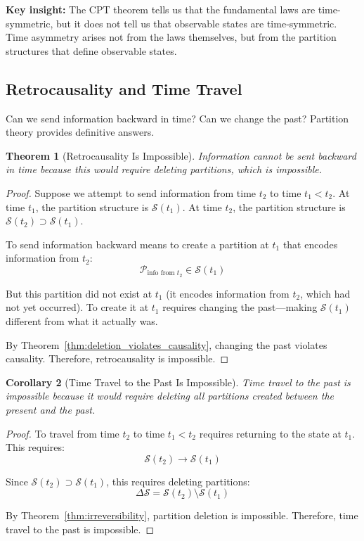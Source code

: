 \documentclass[twocolumn,10pt]{article}
\newtheorem{theorem}{Theorem}[section]
\newtheorem{corollary}[theorem]{Corollary}
\theoremstyle{definition}
\theoremstyle{remark}
\begin{document}
\noindent\textbf{Key insight:} The CPT theorem tells us that the fundamental laws are time-symmetric, but it does not tell us that observable states are time-symmetric. Time asymmetry arises not from the laws themselves, but from the partition structures that define observable states.

\subsection{Retrocausality and Time Travel}

Can we send information backward in time? Can we change the past? Partition theory provides definitive answers.

\begin{theorem}[Retrocausality Is Impossible]
\label{thm:no_retrocausality}
Information cannot be sent backward in time because this would require deleting partitions, which is impossible.
\end{theorem}

\begin{proof}
Suppose we attempt to send information from time $t_2$ to time $t_1 < t_2$. At time $t_1$, the partition structure is $\mathcal{S}(t_1)$. At time $t_2$, the partition structure is $\mathcal{S}(t_2) \supset \mathcal{S}(t_1)$.

To send information backward means to create a partition at $t_1$ that encodes information from $t_2$:
\begin{equation}
\mathcal{P}_{\text{info from } t_2} \in \mathcal{S}(t_1)
\end{equation}

But this partition did not exist at $t_1$ (it encodes information from $t_2$, which had not yet occurred). To create it at $t_1$ requires changing the past—making $\mathcal{S}(t_1)$ different from what it actually was.

By Theorem~\ref{thm:deletion_violates_causality}, changing the past violates causality. Therefore, retrocausality is impossible.
\end{proof}

\begin{corollary}[Time Travel to the Past Is Impossible]
\label{cor:no_time_travel}
Time travel to the past is impossible because it would require deleting all partitions created between the present and the past.
\end{corollary}

\begin{proof}
To travel from time $t_2$ to time $t_1 < t_2$ requires returning to the state at $t_1$. This requires:
\begin{equation}
\mathcal{S}(t_2) \to \mathcal{S}(t_1)
\end{equation}

Since $\mathcal{S}(t_2) \supset \mathcal{S}(t_1)$, this requires deleting partitions:
\begin{equation}
\Delta \mathcal{S} = \mathcal{S}(t_2) \setminus \mathcal{S}(t_1)
\end{equation}

By Theorem~\ref{thm:irreversibility}, partition deletion is impossible. Therefore, time travel to the past is impossible.
\end{proof}
\end{document}
